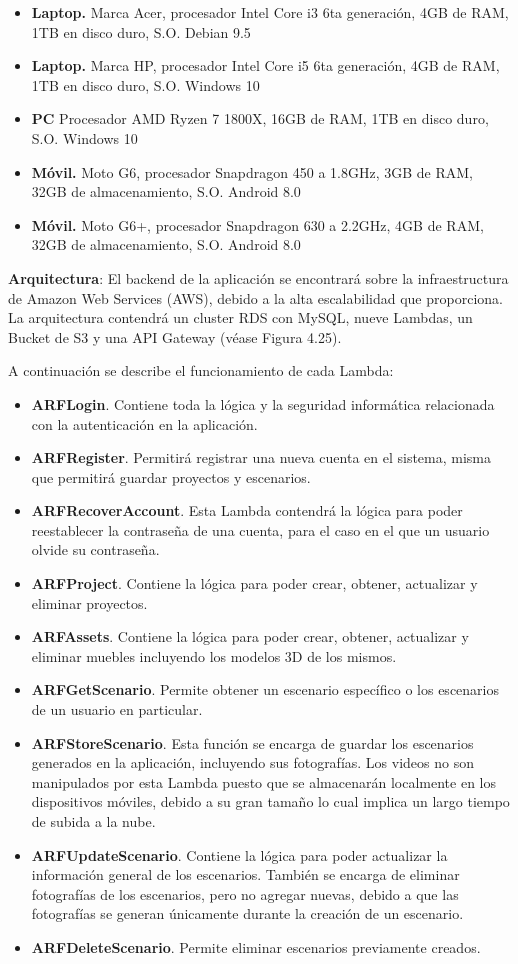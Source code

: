 \begin{itemize}
	\item \textbf{Laptop.} Marca Acer, procesador Intel Core i3 6ta generación, 4GB de RAM, 1TB en disco duro, S.O. Debian 9.5
	\item \textbf{Laptop.} Marca HP, procesador Intel Core i5 6ta generación, 4GB de RAM, 1TB en disco duro, S.O. Windows 10
	\item \textbf{PC} Procesador AMD Ryzen 7 1800X, 16GB de RAM, 1TB en disco duro, S.O. Windows 10
	\item \textbf{Móvil.} Moto G6, procesador Snapdragon 450 a 1.8GHz, 3GB de RAM, 32GB de almacenamiento, S.O. Android 8.0
	\item \textbf{Móvil.} Moto G6+, procesador Snapdragon 630 a 2.2GHz, 4GB de RAM, 32GB de almacenamiento, S.O. Android 8.0	
\end{itemize}
\noindent
\textbf{Arquitectura}:
El backend de la aplicación se encontrará sobre la infraestructura de Amazon Web Services (AWS), debido a la alta escalabilidad que proporciona. La arquitectura contendrá un cluster RDS con MySQL, nueve Lambdas, un Bucket de S3 y una API Gateway (véase Figura 4.25).\par
A continuación se describe el funcionamiento de cada Lambda:\par
\begin{itemize}
	\item\textbf{ARFLogin}. Contiene toda la lógica y la seguridad informática relacionada con la autenticación en la aplicación.
	\item\textbf{ARFRegister}. Permitirá registrar una nueva cuenta en el sistema, misma que permitirá guardar proyectos y escenarios.
	\item\textbf{ARFRecoverAccount}. Esta Lambda contendrá la lógica para poder reestablecer la contraseña de una cuenta, para el caso en el que un usuario olvide su contraseña.
	\item\textbf{ARFProject}. Contiene la lógica para poder crear, obtener, actualizar y eliminar proyectos.
	\item\textbf{ARFAssets}. Contiene la lógica para poder crear, obtener, actualizar y eliminar muebles incluyendo los modelos 3D de los mismos.
	\item\textbf{ARFGetScenario}. Permite obtener un escenario específico o los escenarios de un usuario en particular.
	\item\textbf{ARFStoreScenario}. Esta función se encarga de guardar los escenarios generados en la aplicación, incluyendo sus fotografías. Los videos no son manipulados por esta Lambda puesto que se almacenarán localmente en los dispositivos móviles, debido a su gran tamaño lo cual implica un largo tiempo de subida a la nube.
	\item\textbf{ARFUpdateScenario}. Contiene la lógica para poder actualizar la información general de los escenarios. También se encarga de eliminar fotografías de los escenarios, pero no agregar nuevas, debido a que las fotografías se generan únicamente durante la creación de un escenario.
	\item\textbf{ARFDeleteScenario}. Permite eliminar escenarios previamente creados.
\end{itemize}
